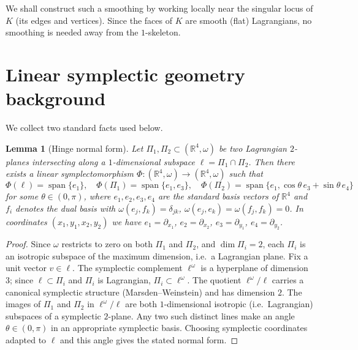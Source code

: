 \documentclass[12pt]{article}
\newtheorem{lemma}[theorem]{Lemma}
\theoremstyle{definition}
\DeclareMathOperator{\Span}{span}
\begin{document}
We shall construct such a smoothing by working locally near the singular locus of $K$ (its edges and vertices). Since the faces of $K$ are smooth (flat) Lagrangians, no smoothing is needed away from the $1$-skeleton.

\section*{Linear symplectic geometry background}

We collect two standard facts used below.

\begin{lemma}[Hinge normal form]
\label{lem:hinge}
Let $\Pi_1, \Pi_2 \subset (\mathbb{R}^4, \omega)$ be two Lagrangian $2$-planes intersecting along a $1$-dimensional subspace $\ell = \Pi_1 \cap \Pi_2$. Then there exists a linear symplectomorphism $\Phi \colon (\mathbb{R}^4, \omega) \to (\mathbb{R}^4, \omega)$ such that
\[
  \Phi(\ell) = \Span\{e_1\},\quad
  \Phi(\Pi_1) = \Span\{e_1, e_3\},\quad
  \Phi(\Pi_2) = \Span\{e_1, \cos\theta\, e_3 + \sin\theta\, e_4\}
\]
for some $\theta \in (0, \pi)$, where $e_1, e_2, e_3, e_4$ are the standard basis vectors of $\mathbb{R}^4$ and $f_i$ denotes the dual basis with $\omega(e_j, f_k) = \delta_{jk}$, $\omega(e_j,e_k)=\omega(f_j,f_k)=0$. In coordinates $(x_1,y_1,x_2,y_2)$ we have $e_1 = \partial_{x_1}$, $e_2 = \partial_{x_2}$, $e_3 = \partial_{y_1}$, $e_4 = \partial_{y_2}$.
\end{lemma}

\begin{proof}
Since $\omega$ restricts to zero on both $\Pi_1$ and $\Pi_2$, and $\dim \Pi_i = 2$, each $\Pi_i$ is an isotropic subspace of the maximum dimension, i.e.\ a Lagrangian plane. Fix a unit vector $v \in \ell$. The symplectic complement $\ell^\omega$ is a hyperplane of dimension $3$; since $\ell \subset \Pi_i$ and $\Pi_i$ is Lagrangian, $\Pi_i \subset \ell^\omega$. The quotient $\ell^\omega / \ell$ carries a canonical symplectic structure (Marsden--Weinstein) and has dimension $2$. The images of $\Pi_1$ and $\Pi_2$ in $\ell^\omega / \ell$ are both $1$-dimensional isotropic (i.e.\ Lagrangian) subspaces of a symplectic $2$-plane. Any two such distinct lines make an angle $\theta \in (0,\pi)$ in an appropriate symplectic basis. Choosing symplectic coordinates adapted to $\ell$ and this angle gives the stated normal form.
\end{proof}
\end{document}
